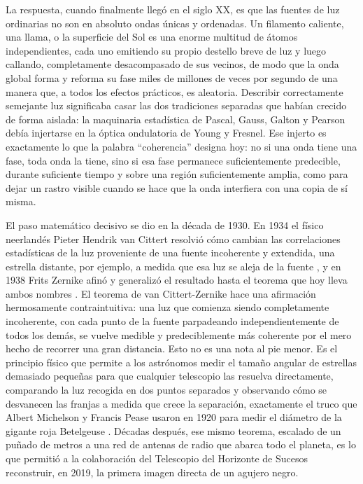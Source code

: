 	La respuesta, cuando finalmente llegó en el siglo XX, es que las fuentes de luz ordinarias no son en absoluto ondas únicas y ordenadas. Un filamento caliente, una llama, o la superficie del Sol es una enorme multitud de átomos independientes, cada uno emitiendo su propio destello breve de luz y luego callando, completamente desacompasado de sus vecinos, de modo que la onda global forma y reforma su fase miles de millones de veces por segundo de una manera que, a todos los efectos prácticos, es aleatoria. Describir correctamente semejante luz significaba casar las dos tradiciones separadas que habían crecido de forma aislada: la maquinaria estadística de Pascal, Gauss, Galton y Pearson debía injertarse en la óptica ondulatoria de Young y Fresnel. Ese injerto es exactamente lo que la palabra ``coherencia'' designa hoy: no si una onda tiene una fase, toda onda la tiene, sino si esa fase permanece suficientemente predecible, durante suficiente tiempo y sobre una región suficientemente amplia, como para dejar un rastro visible cuando se hace que la onda interfiera con una copia de sí misma.

	El paso matemático decisivo se dio en la década de 1930. En 1934 el físico neerlandés Pieter Hendrik van Cittert resolvió cómo cambian las correlaciones estadísticas de la luz proveniente de una fuente incoherente y extendida, una estrella distante, por ejemplo, a medida que esa luz se aleja de la fuente \cite{vancittert1934}, y en 1938 Frits Zernike afinó y generalizó el resultado hasta el teorema que hoy lleva ambos nombres \cite{zernike1938}. El teorema de van Cittert-Zernike hace una afirmación hermosamente contraintuitiva: una luz que comienza siendo completamente incoherente, con cada punto de la fuente parpadeando independientemente de todos los demás, se vuelve medible y predeciblemente más coherente por el mero hecho de recorrer una gran distancia. Esto no es una nota al pie menor. Es el principio físico que permite a los astrónomos medir el tamaño angular de estrellas demasiado pequeñas para que cualquier telescopio las resuelva directamente, comparando la luz recogida en dos puntos separados y observando cómo se desvanecen las franjas a medida que crece la separación, exactamente el truco que Albert Michelson y Francis Pease usaron en 1920 para medir el diámetro de la gigante roja Betelgeuse \cite{michelson1921diameter}. Décadas después, ese mismo teorema, escalado de un puñado de metros a una red de antenas de radio que abarca todo el planeta, es lo que permitió a la colaboración del Telescopio del Horizonte de Sucesos reconstruir, en 2019, la primera imagen directa de un agujero negro.

